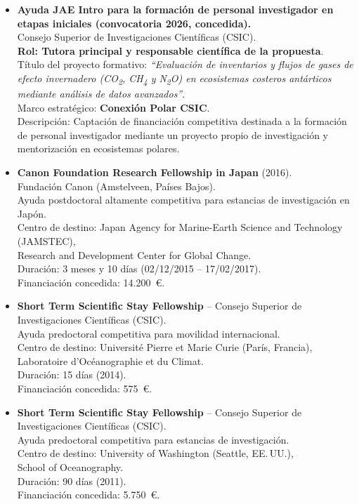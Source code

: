 \documentclass[11pt,a4paper]{article}
\begin{document}
\begin{itemize}[leftmargin=*]

\item \textbf{Ayuda JAE Intro para la formación de personal investigador en etapas iniciales (convocatoria 2026, concedida).}\\
Consejo Superior de Investigaciones Científicas (CSIC).\\
\textbf{Rol: Tutora principal y responsable científica de la propuesta}.\\
Título del proyecto formativo: \emph{“Evaluación de inventarios y flujos de gases de efecto invernadero (CO\textsubscript{2}, CH\textsubscript{4} y N\textsubscript{2}O) en ecosistemas costeros antárticos mediante análisis de datos avanzados”}.\\
Marco estratégico: \textbf{Conexión Polar CSIC}.\\
Descripción: Captación de financiación competitiva destinada a la formación de personal investigador mediante un proyecto propio de investigación y mentorización en ecosistemas polares.
    \item \textbf{Canon Foundation Research Fellowship in Japan} (2016).\\
    Fundación Canon (Amstelveen, Países Bajos).\\
    Ayuda postdoctoral altamente competitiva para estancias de investigación en Japón.\\
    Centro de destino: Japan Agency for Marine-Earth Science and Technology (JAMSTEC),\\
    Research and Development Center for Global Change.\\
    Duración: 3 meses y 10 días (02/12/2015 -- 17/02/2017).\\
    Financiación concedida: 14.200~€.

    \item \textbf{Short Term Scientific Stay Fellowship} -- Consejo Superior de Investigaciones Científicas (CSIC).\\
    Ayuda predoctoral competitiva para movilidad internacional.\\
    Centro de destino: Université Pierre et Marie Curie (París, Francia),\\
    Laboratoire d'Océanographie et du Climat.\\
    Duración: 15 días (2014).\\
    Financiación concedida: 575~€.

    \item \textbf{Short Term Scientific Stay Fellowship} -- Consejo Superior de Investigaciones Científicas (CSIC).\\
    Ayuda predoctoral competitiva para estancias de investigación.\\
    Centro de destino: University of Washington (Seattle, EE.\,UU.),\\
    School of Oceanography.\\
    Duración: 90 días (2011).\\
    Financiación concedida: 5.750~€.


\end{itemize}
\end{document}
